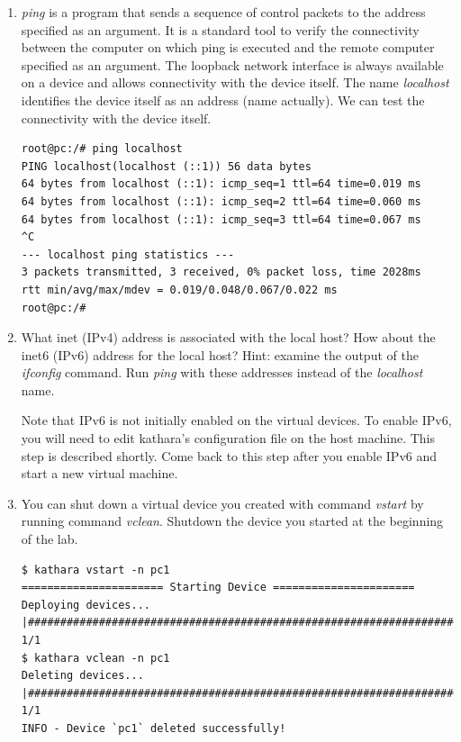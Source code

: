 \documentclass[12pt]{book}
\begin{document}
\begin{enumerate}[label=\arabic*.]
\begin{enumerate}[label=Activity \arabic*:]
\item \emph{ping} is a program that sends a sequence of control packets to the address specified as an argument. It is a standard tool to verify the connectivity between the computer on which ping is executed and the remote computer specified as an argument. The loopback network interface is always available on a device and allows connectivity with the device itself. The name \emph{localhost} identifies the device itself as an address (name actually). We can test the connectivity with the device itself.

\begin{lstlisting}
root@pc:/# ping localhost
PING localhost(localhost (::1)) 56 data bytes
64 bytes from localhost (::1): icmp_seq=1 ttl=64 time=0.019 ms
64 bytes from localhost (::1): icmp_seq=2 ttl=64 time=0.060 ms
64 bytes from localhost (::1): icmp_seq=3 ttl=64 time=0.067 ms
^C
--- localhost ping statistics ---
3 packets transmitted, 3 received, 0% packet loss, time 2028ms
rtt min/avg/max/mdev = 0.019/0.048/0.067/0.022 ms
root@pc:/# 
\end{lstlisting}

\item What inet (IPv4) address is associated with the local host? How about the inet6 (IPv6) address for the local host? Hint: examine the output of the \emph{ifconfig} command. Run \emph{ping} with these addresses instead of the \emph{localhost} name.

  Note that IPv6 is not initially enabled on the virtual devices. To enable IPv6, you will need to edit kathara's configuration file on the host machine. This step is described shortly. Come back to this step after you enable IPv6 and start a new virtual machine.

\item You can shut down a virtual device you created with command \emph{vstart} by running command \emph{vclean}. Shutdown the device you started at the beginning of the lab.

\begin{lstlisting}
$ kathara vstart -n pc1
====================== Starting Device ======================
Deploying devices... |##############################################################################| 1/1
$ kathara vclean -n pc1
Deleting devices... |###############################################################################| 1/1
INFO - Device `pc1` deleted successfully!
\end{lstlisting}
\end{enumerate}


\end{enumerate}
\end{document}
